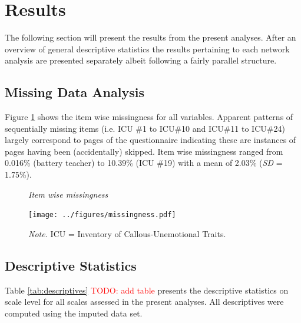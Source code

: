 \documentclass[a4paper,12pt]{article} %
\newcommand{\todo}[1]{\textcolor{red}{TODO: #1}\PackageWarning{TODO:}{#1!}} %
\begin{document}
 
\section{Results}

The following section will present the results from the present analyses.
After an overview of general descriptive statistics the results pertaining to each 
network analysis are presented separately albeit following a fairly parallel structure.


\subsection{Missing Data Analysis}
Figure \ref{fig:itemwise_missingness} shows the item wise missingness for all variables. 
Apparent patterns of sequentially missing items (i.e. ICU \#1 to ICU\#10 and ICU\#11 to ICU\#24) largely correspond to
pages of the questionnaire indicating these are instances of pages having been (accidentally) skipped.
Item wise missingness ranged from 0.016\% (battery teacher) to 10.39\% (ICU \#19) with a mean of 2.03\% (\textit{SD} = 1.75\%).
\begin{figure}[h!]
	\caption{\label{fig:itemwise_missingness}\protect\linebreak[1]\textit{Item wise missingness}}
	\centering
	\texttt{[image: ../figures/missingness.pdf]}
	\caption*{\textit{Note.} ICU = Inventory of Callous-Unemotional Traits.}
\end{figure}


\subsection{Descriptive Statistics}
Table \ref{tab:descriptives} \todo{add table} presents the descriptive statistics on scale level for all scales assessed in the present analyses.
All descriptives were computed using the imputed data set.
\end{document}
